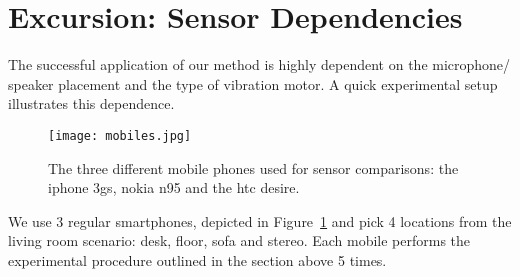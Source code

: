 % 
%

\section{Excursion: Sensor Dependencies}

The successful application of our method is
highly dependent on the microphone/ speaker placement and the type of
vibration motor. A quick experimental setup illustrates this
dependence.


\begin{figure}[t]
\centering  
\texttt{[image: mobiles.jpg]}
\caption[Smartphones]{The three different mobile phones used for sensor
 comparisons: the iphone 3gs, nokia n95 and the htc
 desire.} \label{fig:mobiles}

\end{figure}

We use 3 regular smartphones, depicted in Figure~\ref{fig:mobiles} and
pick 4 locations from the living room scenario: desk, floor, sofa and
stereo. Each mobile performs the experimental procedure outlined in
the section above 5 times.


